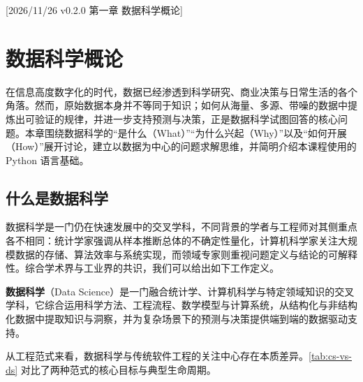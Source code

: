 %
%
[2026/11/26 v0.2.0 第一章 数据科学概论]
\chapter{数据科学概论}\label{ch:overview}

在信息高度数字化的时代，数据已经渗透到科学研究、商业决策与日常生活的各个角落。然而，原始数据本身并不等同于知识；如何从海量、多源、带噪的数据中提炼出可验证的规律，并进一步支持预测与决策，正是数据科学试图回答的核心问题。本章围绕数据科学的“是什么（What）”“为什么兴起（Why）”以及“如何开展（How）”展开讨论，建立以数据为中心的问题求解思维，并简明介绍本课程使用的 Python 语言基础。

\section{什么是数据科学}\label{sec:what-is-ds}

数据科学是一门仍在快速发展中的交叉学科，不同背景的学者与工程师对其侧重点各不相同：统计学家强调从样本推断总体的不确定性量化，计算机科学家关注大规模数据的存储、算法效率与系统实现，而领域专家则重视问题定义与结论的可解释性。综合学术界与工业界的共识，我们可以给出如下工作定义。

\begin{definition}[数据科学]\label{def:data-science}
\textbf{数据科学}（Data Science）是一门融合统计学、计算机科学与特定领域知识的交叉学科，它综合运用科学方法、工程流程、数学模型与计算系统，从结构化与非结构化数据中提取知识与洞察，并为复杂场景下的预测与决策提供端到端的数据驱动支持。
\end{definition}

从工程范式来看，数据科学与传统软件工程的关注中心存在本质差异。\cref{tab:cs-vs-ds} 对比了两种范式的核心目标与典型生命周期。

